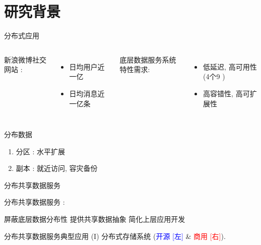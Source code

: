 \section{研究背景}

\begin{frame}{分布式应用}

  \begin{columns}
	新浪微博社交网站 \footnotemark:
	\begin{itemize}
	  \item 日均用户近一亿
	  \item 日均消息近一亿条
	\end{itemize}

	底层数据服务系统特性需求:
	\begin{itemize}
	  \item 低延迟, 高可用性 (4个9 \footnotemark)
	  \item 高容错性, 高可扩展性
	\end{itemize}
  \end{columns}
  
\end{frame}
\begin{frame}{分布数据}

   
  \begin{enumerate}
	\item<2-> 分区 : 水平扩展
	\item<3-> 副本 : 就近访问, 容灾备份
  \end{enumerate}
\end{frame}
\begin{frame}{分布共享数据服务}

  \begin{center}
	分布共享数据服务 :
	\vspace{0.50cm}

	屏蔽底层数据分布性\; 提供共享数据抽象\; 简化上层应用开发
  \end{center}
\end{frame}
\begin{frame}{分布共享数据服务典型应用 (I)}
  {分布式存储系统 (\textcolor{blue}{\scriptsize 开源 [左]} \& \textcolor{red}{\scriptsize 商用 [右]}).}

\end{frame}
